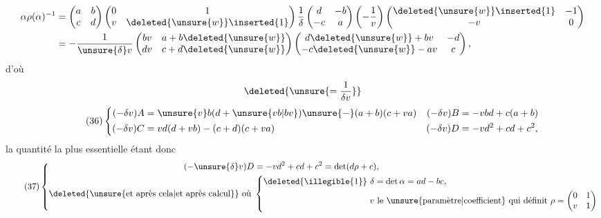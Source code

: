 \[
\begin{aligned}
\alpha\rho(\alpha)^{-1}
&=\begin{pmatrix}a&b\\c&d\end{pmatrix}
\begin{pmatrix}0&1\\v&\deleted{\unsure{w}}\inserted{1}\end{pmatrix}
\frac1\delta\begin{pmatrix}d&-b\\-c&a\end{pmatrix}
\left(-\frac1v\right)
\begin{pmatrix}\deleted{\unsure{w}}\inserted{1}&-1\\-v&0\end{pmatrix}\\
&=-\frac1{\unsure{\delta}v}
\begin{pmatrix}bv&a+b\deleted{\unsure{w}}\\dv&c+d\deleted{\unsure{w}}\end{pmatrix}
\begin{pmatrix}d\deleted{\unsure{w}}+bv&-d\\-c\deleted{\unsure{w}}-av&c\end{pmatrix},
\end{aligned}
\]
d'où
\[
\deleted{\unsure{=\frac1{\delta v}}}
\]
\[
\tag{36}
\left\{\begin{aligned}
(-\delta v)A&=\unsure{v}b(d+\unsure{vb|bv})\unsure{-}(a+b)(c+va)
&(-\delta v)B&=-vbd+c(a+b)\\
(-\delta v)C&=vd(d+vb)-(c+d)(c+va)
&(-\delta v)D&=-vd^2+cd+c^2,
\end{aligned}\right.
\]
la quantité la plus essentielle étant donc
\[
\tag{37}
\left\{\begin{aligned}
(-\unsure{\delta}v)D&=-vd^2+cd+c^2=\det(d\rho+c),\\
\text{\deleted{\unsure{et après cela|et après calcul}} où }&
\left\{\begin{aligned}
\deleted{\illegible{1}}\ \delta&=\det\alpha=ad-bc,\\
v&\ \text{le \unsure{paramètre|coefficient} qui définit }
\rho=\begin{pmatrix}0&1\\v&1\end{pmatrix}
\end{aligned}\right.
\end{aligned}\right.
\]
